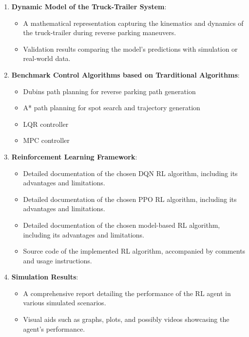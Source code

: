 \begin{enumerate}
    \item \textbf{Dynamic Model of the Truck-Trailer System}:
    \begin{itemize}
        \item A mathematical representation capturing the kinematics and dynamics of the truck-trailer during reverse parking maneuvers.
        \item Validation results comparing the model's predictions with simulation or real-world data.
    \end{itemize}
    
    \item \textbf{Benchmark Control Algorithms based on Trarditional Algorithms}:
    \begin{itemize}
        \item Dubins path planning for reverse parking path generation
        \item A* path planning for spot search and trajectory generation
        \item LQR controller
        \item MPC controller
    \end{itemize}
    
    \item \textbf{Reinforcement Learning Framework}:
    \begin{itemize}
        \item Detailed documentation of the chosen DQN RL algorithm, including its advantages and limitations.
        \item Detailed documentation of the chosen PPO RL algorithm, including its advantages and limitations.
        \item Detailed documentation of the chosen model-based RL algorithm, including its advantages and limitations.
        \item Source code of the implemented RL algorithm, accompanied by comments and usage instructions.
    \end{itemize}
    
    \item \textbf{Simulation Results}:
    \begin{itemize}
        \item A comprehensive report detailing the performance of the RL agent in various simulated scenarios.
        \item Visual aids such as graphs, plots, and possibly videos showcasing the agent's performance.
    \end{itemize}
    

\end{enumerate}
